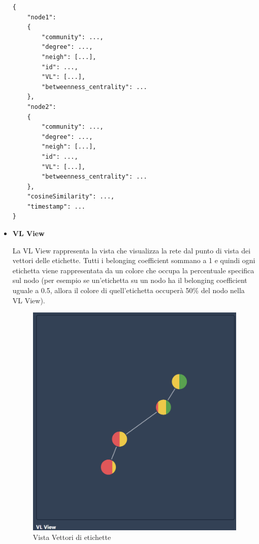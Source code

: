 \documentclass[a4paper,12pt]{report}
\begin{document}
\begin{itemize}
			\begin{lstlisting}
{
	"node1": 
	{
		"community": ...,
		"degree": ...,
		"neigh": [...],
		"id": ...,
		"VL": [...],
		"betweenness_centrality": ...
	},
	"node2": 
	{
		"community": ...,
		"degree": ...,
		"neigh": [...],
		"id": ...,
		"VL": [...],
		"betweenness_centrality": ...
	},
	"cosineSimilarity": ...,
	"timestamp": ...
}
			\end{lstlisting}


\pagebreak
			\item \textbf{VL View} 

			La VL View rappresenta la vista che visualizza la rete dal punto di vista dei vettori delle etichette. Tutti i belonging coefficient sommano a 1 e quindi ogni etichetta viene rappresentata da un colore che occupa la percentuale specifica sul nodo (per esempio se un'etichetta su un nodo ha il belonging coefficient uguale a 0.5, allora il colore di quell'etichetta occuperà 50\% del nodo nella VL View). 
			
			\begin{center}
			\begin{figure}[H]
			\centering
			\includegraphics[width=0.9\linewidth,keepaspectratio]{vlview}
			\caption{Vista Vettori di etichette}
			\end{figure}
			\end{center}


\end{itemize}
\end{document}

